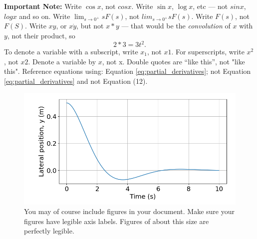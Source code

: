 \documentclass[a4paper,11pt,reqno]{amsart}
\begin{document}
\begin{tcolorbox}[title={Common typesetting mistakes}]
\textbf{Important Note:} 
Write $\cos x$, not $cos x$.
Write $\sin x$, $\log x$, etc --- not $sin x$, $log x$ and so on.
Write $\lim_{s\to 0^+} sF(s)$, not $lim_{s\to 0^+} sF(s)$.
Write $F(s)$, not $F(S)$. 
Write $xy$, or $x\dot y$, but not $x*y$ --- that would be the \textit{convolution} of $x$ with $y$, not their product, so
\begin{equation}
 2 * 3 = 3t^2.
\end{equation}
To denote a variable with a subscript, write $x_1$, not $x1$. 
For superscripts, write $x^2$, not $x2$.
Denote a variable by $x$, not x.
Double quotes are ``like this'', not "like this".
Reference equations using: Equation \eqref{eq:partial_derivatives}; 
not Equation \ref{eq:partial_derivatives} and not Equation (12).
\end{tcolorbox}



\begin{figure}
 \centering
 \includegraphics[width=0.65\linewidth]{figures/lateral_position}
 \caption{You may of course include figures in your document. Make sure your figures have 
          legible axis labels. Figures of about this size are perfectly legible.}
\end{figure}
\end{document}
